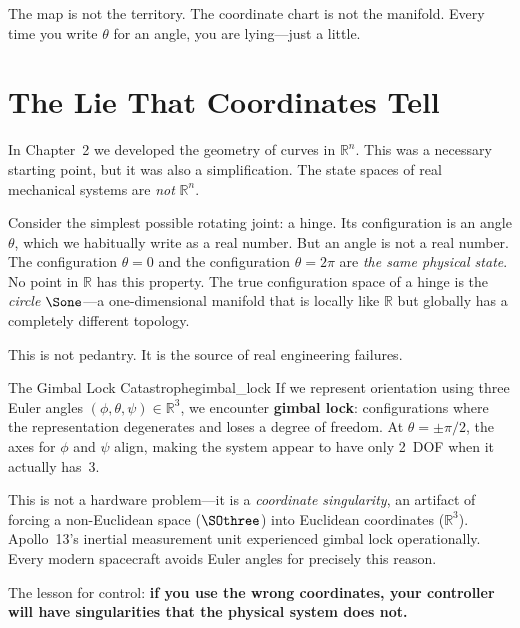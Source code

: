 \documentclass[12pt, openany]{book}
\theoremstyle{plain}
\newcommand{\Reals}{\mathbb{R}}
\begin{document}
\epigraph{%
  The map is not the territory. The coordinate chart is not the manifold.
  Every time you write $\theta$ for an angle, you are lying---just a little.
}{}

\vspace{0.5cm}

\section{The Lie That Coordinates Tell}

In Chapter~2 we developed the geometry of curves in $\Reals^n$. This was a
necessary starting point, but it was also a simplification. The state spaces
of real mechanical systems are \emph{not} $\Reals^n$.

Consider the simplest possible rotating joint: a hinge. Its configuration is
an angle $\theta$, which we habitually write as a real number. But an angle
is not a real number. The configuration $\theta = 0$ and the configuration
$\theta = 2\pi$ are \emph{the same physical state}. No point in $\Reals$
has this property. The true configuration space of a hinge is the
\emph{circle} $\Sone$---a one-dimensional manifold that is locally like
$\Reals$ but globally has a completely different topology.

This is not pedantry. It is the source of real engineering failures.

\begin{warning}{The Gimbal Lock Catastrophe}{gimbal_lock}
  If we represent orientation using three Euler angles
  $(\phi, \theta, \psi) \in \Reals^3$, we encounter \textbf{gimbal lock}:
  configurations where the representation degenerates and loses a degree of
  freedom. At $\theta = \pm\pi/2$, the axes for $\phi$ and $\psi$ align,
  making the system appear to have only 2~DOF when it actually has~3.

  This is not a hardware problem---it is a \emph{coordinate singularity},
  an artifact of forcing a non-Euclidean space ($\SOthree$) into Euclidean
  coordinates ($\Reals^3$). Apollo~13's inertial measurement unit
  experienced gimbal lock operationally. Every modern spacecraft avoids
  Euler angles for precisely this reason.

  The lesson for control: \textbf{if you use the wrong coordinates, your
  controller will have singularities that the physical system does not.}
\end{warning}
\end{document}
